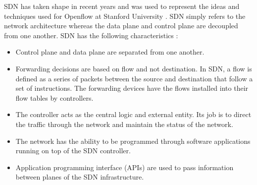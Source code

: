 \documentclass[conference]{IEEEtran}
\begin{document}


SDN has taken shape in recent years and was used to represent the ideas and techniques used for Openflow at Stanford University \cite{mckeown2008openflow, nisar2019survey}. SDN simply refers to the network architecture whereas the data plane and control plane are decoupled from one another. SDN has the following characteristics \cite{maleh2022comprehensive}:
\begin{itemize}
    \item Control plane and data plane are separated from one another.
    \item Forwarding decisions are based on flow and not destination. In SDN, a flow is defined as a series of packets between the source and destination that follow a set of instructions. The forwarding devices have the flows installed into their flow tables by controllers.
    \item The controller acts as the central logic and external entity. Its job is to direct the traffic through the network and maintain the status of the network.
    \item The network has the ability to be programmed through software applications running on top of the SDN controller.
    \item Application programming interface (APIs) are used to pass information between planes of the SDN infrastructure.
\end{itemize}
\end{document}
